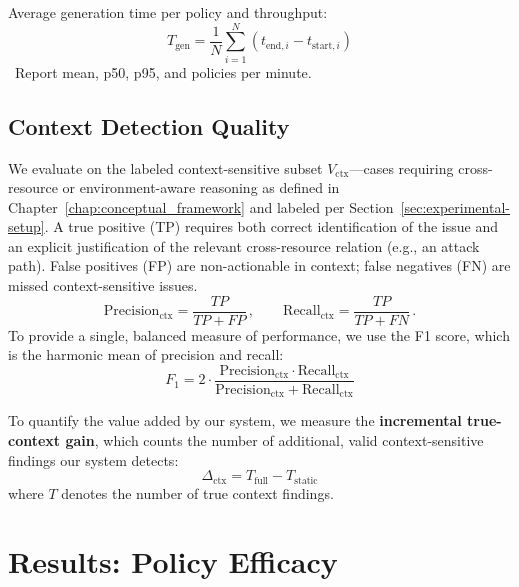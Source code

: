 Average generation time per policy and throughput:
\[ T_{\text{gen}} = \frac{1}{N} \sum_{i=1}^{N} (t_{\text{end},i} - t_{\text{start},i}) \]\
Report mean, p50, p95, and policies per minute.

\subsection{Context Detection Quality}\label{sec:metrics-context}
We evaluate on the labeled context-sensitive subset $V_{\text{ctx}}$—cases requiring cross-resource or environment-aware reasoning as defined in Chapter~\ref{chap:conceptual_framework} and labeled per Section~\ref{sec:experimental-setup}. A true positive (TP) requires both correct identification of the issue and an explicit justification of the relevant cross-resource relation (e.g., an attack path). False positives (FP) are non-actionable in context; false negatives (FN) are missed context-sensitive issues.
\[ \mathrm{Precision}_{\mathrm{ctx}} = \frac{TP}{TP+FP}\,,\qquad \mathrm{Recall}_{\mathrm{ctx}} = \frac{TP}{TP+FN} \,. \]
To provide a single, balanced measure of performance, we use the F1 score, which is the harmonic mean of precision and recall:
\[ F_1 = 2 \cdot \frac{\mathrm{Precision}_{\mathrm{ctx}} \cdot \mathrm{Recall}_{\mathrm{ctx}}}{\mathrm{Precision}_{\mathrm{ctx}} + \mathrm{Recall}_{\mathrm{ctx}}} \]

To quantify the value added by our system, we measure the \textbf{incremental true-context gain}, which counts the number of additional, valid context-sensitive findings our system detects:
\[ \Delta_{\mathrm{ctx}} = T_{\mathrm{full}} - T_{\mathrm{static}} \]
where $T$ denotes the number of true context findings.

\section{Results: Policy Efficacy}\label{sec:results-efficacy}

